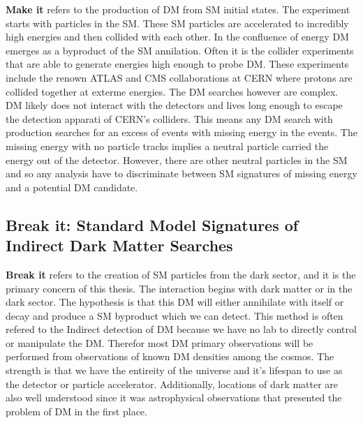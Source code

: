 
\textbf{Make it} refers to the production of DM from SM initial states.
The experiment starts with particles in the SM.
These SM particles are accelerated to incredibly high energies and then collided with each other.
In the confluence of energy DM emerges as a byproduct of the SM annilation.
Often it is the collider experiments that are able to generate energies high enough to probe DM.
These experiments include the renown ATLAS and CMS collaborations at CERN where protons are collided together at exterme energies.
The DM searches however are complex.
DM likely does not interact with the detectors and lives long enough to escape the detection apparati of CERN's colliders.
This means any DM search with production searches for an excess of events with missing energy in the events.
The missing energy with no particle tracks implies a neutral particle carried the energy out of the detector.
However, there are other neutral particles in the SM and so any analysis have to discriminate between SM signatures of missing energy and a potential DM candidate.


\subsection{Break it: Standard Model Signatures of Indirect Dark Matter Searches\label{sec:break_it}}

\textbf{Break it} refers to the creation of SM particles from the dark sector, and it is the primary concern of this thesis.
The interaction begins with dark matter or in the dark sector.
The hypothesis is that this DM will either annihilate with itself or decay and produce a SM byproduct which we can detect.
This method is often refered to the Indirect detection of DM because we have no lab to directly control or manipulate the DM.
Therefor most DM primary observations will be performed from observations of known DM densities among the cosmos.
The strength is that we have the entireity of the universe and it's lifespan to use as the detector or particle accelerator.
Additionally, locations of dark matter are also well understood since it was astrophysical observations that presented the problem of DM in the first place.

